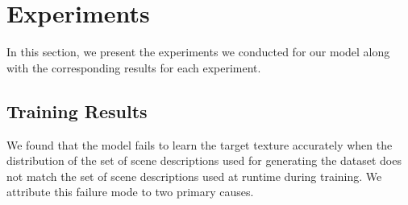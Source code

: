 \chapter{Experiments} \label{ch:experiment}

In this section, we present the experiments we conducted for our model along with the
corresponding results for each experiment.

\section{Training Results} \label{sec:training-results}

We found that the model fails to learn the target texture accurately when the distribution
of the set of scene descriptions used for generating the dataset does not match the set of
scene descriptions used at runtime during training. We attribute this failure mode to two
primary causes.

